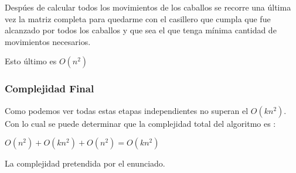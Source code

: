 Desp\'ues de calcular todos los movimientos de los caballos se recorre una \'ultima vez la matriz completa para quedarme con el casillero que cumpla que fue alcanzado por todos los caballos y que sea el que tenga m\'inima cantidad de movimientos necesarios.

Esto \'ultimo es $O(n^2)$

\subsubsection{Complejidad Final}

Como podemos ver todas estas etapas independientes no superan el $O(k n^2)$. Con lo cual se puede determinar que la complejidad total del algoritmo es :

\begin{center}
	$O(n^2) + O(k n^2) + O(n^2) = O(k n^2)$
\end{center}

La complejidad pretendida por el enunciado.